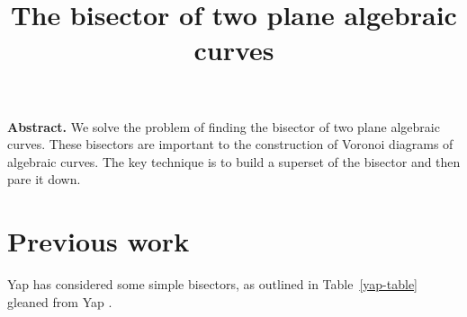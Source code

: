 %

%
%
\DoubleSpace
\setlength{\oddsidemargin}{0pt}
\setlength{\evensidemargin}{0pt}
\setlength{\headsep}{0pt}
\setlength{\topmargin}{0pt}
\setlength{\textheight}{8.75in}
\setlength{\textwidth}{6.5in}
%
%
\title{The bisector of two plane algebraic curves}


{\bf Abstract.}
We solve the problem of finding the bisector of two plane algebraic curves.
These bisectors are important to the construction of Voronoi diagrams of 
algebraic curves.
The key technique is to build a superset of the bisector and then pare it down.

\section{Previous work}

Yap \cite{Y85} has considered some simple bisectors, as outlined in 
Table~\ref{yap-table} gleaned from Yap \cite[p. 371--72]{Y87}.


